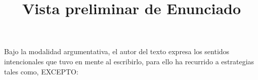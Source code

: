 \documentclass[a4paper,12pt]{article}\usepackage[utf8]{inputenc}\usepackage[spanish]{babel}\usepackage{times}
\title{Vista preliminar de Enunciado}
\begin{document}
\twocolumn 

\maketitle

Bajo la modalidad argumentativa, el autor del texto expresa los sentidos intencionales que tuvo en mente al escribirlo, para ello ha recurrido a estrategias tales como, EXCEPTO:
\end{document}

